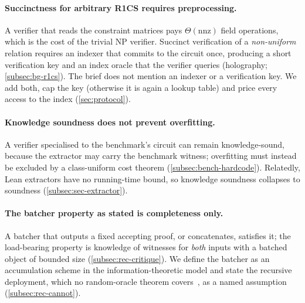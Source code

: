 \paragraph{Succinctness for arbitrary R1CS requires preprocessing.} A verifier that reads the
constraint matrices pays $\Theta(\mathrm{nnz})$ field operations, which is the cost of the trivial NP
verifier. Succinct verification of a \emph{non-uniform} relation requires an indexer that commits to
the circuit once, producing a short verification key and an index oracle that the verifier queries
(holography; \cref{subsec:bg-r1cs}). The brief does not mention an indexer or a verification key. We
add both, cap the key (otherwise it is again a lookup table) and price every access to the index
(\cref{sec:protocol}).

\paragraph{Knowledge soundness does not prevent overfitting.} A verifier specialised to the
benchmark's circuit can remain knowledge-sound, because the extractor may carry the benchmark
witness; overfitting must instead be excluded by a class-uniform cost theorem
(\cref{subsec:bench-hardcode}). Relatedly, Lean extractors have no running-time bound, so knowledge
soundness collapses to soundness (\cref{subsec:sec-extractor}).

\paragraph{The batcher property as stated is completeness only.} A batcher that outputs a fixed
accepting proof, or concatenates, satisfies it; the load-bearing property is knowledge of witnesses
for \emph{both} inputs with a batched object of bounded size (\cref{subsec:rec-critique}). We define
the batcher as an accumulation scheme in the information-theoretic model and state the recursive
deployment, which no random-oracle theorem covers~\cite{BCG24-RelROM}, as a named assumption
(\cref{subsec:rec-cannot}).

